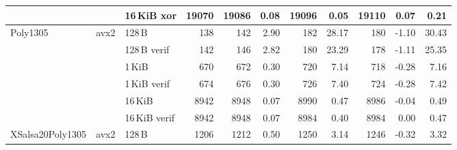 \begin{table}[H]
\begin{tabular}{lllrrrrrrrr}
 &      & 16\,KiB xor   & 19070
                        & 19086
                        & 0.08
                        & 19096
                        & 0.05
                        & 19110
                        & 0.07
                        & 0.21 \\

     \midrule
    \multirow{6}{*}{Poly1305}
 &  \multirow{6}{*}{avx2}
        & 128\,B        & 138
                        & 142
                        & 2.90
                        & 182
                        & 28.17
                        & 180
                        & -1.10
                        & 30.43 \\

 &      & 128\,B verif  & 142
                        & 146
                        & 2.82
                        & 180
                        & 23.29
                        & 178
                        & -1.11
                        & 25.35 \\

 &      & 1\,KiB        & 670
                        & 672
                        & 0.30
                        & 720
                        & 7.14
                        & 718
                        & -0.28
                        & 7.16 \\

 &      & 1\,KiB verif  & 674
                        & 676
                        & 0.30
                        & 726
                        & 7.40
                        & 724
                        & -0.28
                        & 7.42 \\

 &      & 16\,KiB       & 8942
                        & 8948
                        & 0.07
                        & 8990
                        & 0.47
                        & 8986
                        & -0.04
                        & 0.49 \\

 &      & 16\,KiB verif & 8942
                        & 8948
                        & 0.07
                        & 8984
                        & 0.40
                        & 8984
                        & 0.00
                        & 0.47 \\

      \midrule
    \multirow{8}{*}{XSalsa20Poly1305}
 &  \multirow{6}{*}{avx2}
        & 128\,B        & 1206
                        & 1212
                        & 0.50
                        & 1250
                        & 3.14
                        & 1246
                        & -0.32
                        & 3.32 \\


\end{tabular}
\end{table}
